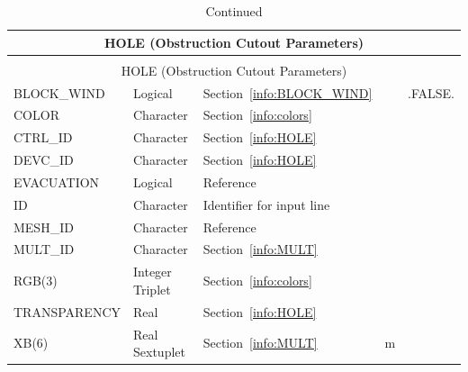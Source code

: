\documentclass[11pt]{book}
\begin{document}
\begin{longtable}{@{\extracolsep{\fill}}|l|l|l|l|l|}
\caption[Obstruction cutout parameters ({\ct HOLE} namelist group)]{For more information see Section~\ref{info:HOLE}.}
\label{tbl:HOLE} \\
\hline
\multicolumn{5}{|c|}{{\ct HOLE} (Obstruction Cutout Parameters)} \\
\hline \hline
\endfirsthead
\caption[]{Continued} \\
\hline
\multicolumn{5}{|c|}{{\ct HOLE} (Obstruction Cutout Parameters)} \\
\hline \hline
\endhead
{\ct BLOCK\_WIND}  & Logical           & Section~\ref{info:BLOCK_WIND}                          &       &  {\ct .FALSE.}  \\ \hline
{\ct COLOR    }    & Character         & Section~\ref{info:colors}                              &       &                 \\ \hline
{\ct CTRL\_ID}     & Character         & Section~\ref{info:HOLE}                                &       &                 \\ \hline
{\ct DEVC\_ID}     & Character         & Section~\ref{info:HOLE}                                &       &                 \\ \hline
{\ct EVACUATION}   & Logical           & Reference~\cite{FDS_Evac_Users_Guide}                  &       &                 \\ \hline
{\ct ID }          & Character         & Identifier for input line                              &       &                 \\ \hline
{\ct MESH\_ID }    & Character         & Reference~\cite{FDS_Evac_Users_Guide}                  &       &                 \\ \hline
{\ct MULT\_ID }    & Character         & Section~\ref{info:MULT}                                &       &                 \\ \hline
{\ct RGB(3)   }    & Integer Triplet   & Section~\ref{info:colors}                              &       &                 \\ \hline
{\ct TRANSPARENCY} & Real              & Section~\ref{info:HOLE}                                &       &                 \\ \hline
{\ct XB(6)    }    & Real Sextuplet    & Section~\ref{info:MULT}                                & m     &                 \\ \hline
\end{longtable}
\end{document}
